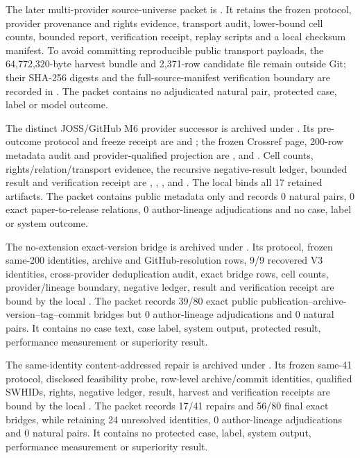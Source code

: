 The later multi-provider source-universe packet is
. It retains the
frozen protocol, provider provenance and rights evidence, transport audit,
lower-bound cell counts, bounded report, verification receipt, replay scripts
and a local checksum manifest. To avoid committing reproducible public
transport payloads, the 64,772,320-byte harvest bundle and 2,371-row candidate
file remain outside Git; their SHA-256 digests and the full-source-manifest
verification boundary are recorded in . The
packet contains no adjudicated natural pair, protected case, label or model
outcome.

The distinct JOSS/GitHub M6 provider successor is archived under
. Its
pre-outcome protocol and freeze receipt are  and
; the frozen Crossref page, 200-row
metadata audit and provider-qualified projection are ,
 and . Cell counts,
rights/relation/transport evidence, the recursive negative-result ledger,
bounded result and verification receipt are ,
,
,  and
. The local  binds all 17 retained
artifacts. The packet contains public metadata only and records 0 natural
pairs, 0 exact paper-to-release relations, 0 author-lineage adjudications and
no case, label or system outcome.

The no-extension exact-version bridge is archived under
. Its protocol,
frozen same-200 identities, archive and GitHub-resolution rows, 9/9 recovered
V3 identities, cross-provider deduplication audit, exact bridge rows, cell
counts, provider/lineage boundary, negative ledger, result and verification
receipt are bound by the local . The packet records 39/80 exact
public publication--archive-version--tag--commit bridges but 0 author-lineage
adjudications and 0 natural pairs. It contains no case text, case label, system
output, protected result, performance measurement or superiority result.

The same-identity content-addressed repair is archived under
. Its frozen same-41
protocol, disclosed feasibility probe, row-level archive/commit identities,
qualified SWHIDs, rights, negative ledger, result, harvest and verification
receipts are bound by the local . The packet records 17/41
repairs and 56/80 final exact bridges, while retaining 24 unresolved identities,
0 author-lineage adjudications and 0 natural pairs. It contains no protected
case, label, system output, performance measurement or superiority result.

